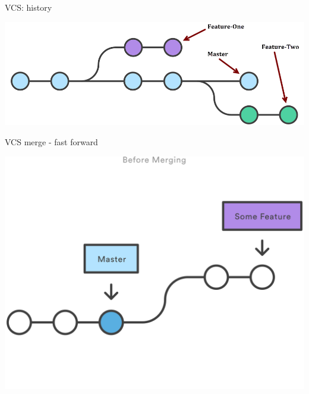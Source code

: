 \begin{frame}[fragile]{VCS: history}

\begin{center}
\includegraphics[width=\textwidth]{vcs-history}
\end{center}

\end{frame}


\begin{frame}[fragile]{VCS merge - fast forward}

\begin{center}
\includegraphics[width=\textwidth]{git-merge-ff}
\end{center}

\end{frame}


